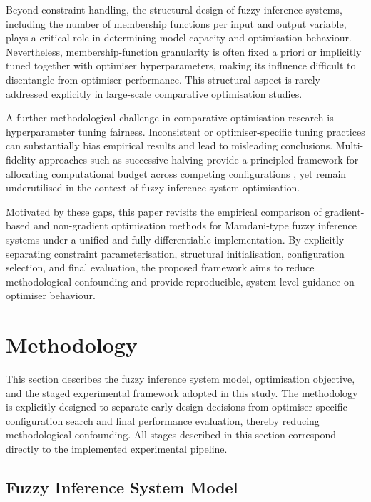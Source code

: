 \documentclass[conference]{IEEEtran}
\begin{document}
Beyond constraint handling, the structural design of fuzzy inference systems,
including the number of membership functions per input and output variable,
plays a critical role in determining model capacity and optimisation behaviour.
Nevertheless, membership-function granularity is often fixed a priori or
implicitly tuned together with optimiser hyperparameters, making its influence
difficult to disentangle from optimiser performance.
This structural aspect is rarely addressed explicitly in large-scale
comparative optimisation studies.

A further methodological challenge in comparative optimisation research is
hyperparameter tuning fairness.
Inconsistent or optimiser-specific tuning practices can substantially bias
empirical results and lead to misleading conclusions.
Multi-fidelity approaches such as successive halving provide a principled
framework for allocating computational budget across competing configurations
\cite{jamieson2016sh}, yet remain underutilised in the context of fuzzy inference
system optimisation.

Motivated by these gaps, this paper revisits the empirical comparison of
gradient-based and non-gradient optimisation methods for Mamdani-type fuzzy
inference systems under a unified and fully differentiable implementation.
By explicitly separating constraint parameterisation, structural
initialisation, configuration selection, and final evaluation, the proposed
framework aims to reduce methodological confounding and provide reproducible,
system-level guidance on optimiser behaviour.

\section{Methodology}\label{sec:method}

This section describes the fuzzy inference system model, optimisation objective,
and the staged experimental framework adopted in this study.
The methodology is explicitly designed to separate early design decisions from
optimiser-specific configuration search and final performance evaluation, thereby
reducing methodological confounding.
All stages described in this section correspond directly to the implemented
experimental pipeline.

\subsection{Fuzzy Inference System Model}
\end{document}
